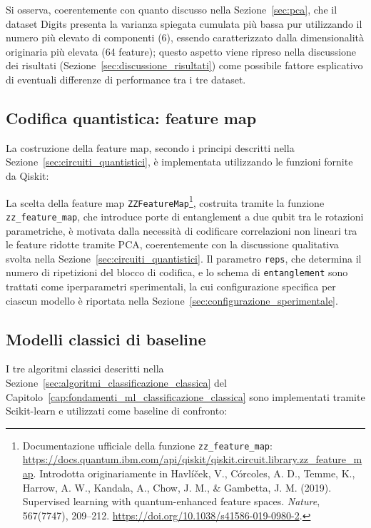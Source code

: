 Si osserva, coerentemente con quanto discusso nella Sezione~\ref{sec:pca}, che il dataset Digits presenta la varianza spiegata cumulata più bassa pur utilizzando il numero più elevato di componenti (6), essendo caratterizzato dalla dimensionalità originaria più elevata (64 feature); questo aspetto viene ripreso nella discussione dei risultati (Sezione~\ref{sec:discussione_risultati}) come possibile fattore esplicativo di eventuali differenze di performance tra i tre dataset.

\subsection{Codifica quantistica: feature map}
\label{sec:impl_feature_map}

La costruzione della feature map, secondo i principi descritti nella Sezione~\ref{sec:circuiti_quantistici}, è implementata utilizzando le funzioni fornite da Qiskit:



La scelta della feature map \texttt{ZZFeatureMap}\footnote{Documentazione ufficiale della funzione \texttt{zz\_feature\_map}: \url{https://docs.quantum.ibm.com/api/qiskit/qiskit.circuit.library.zz_feature_map}. Introdotta originariamente in Havlíček, V., Córcoles, A. D., Temme, K., Harrow, A. W., Kandala, A., Chow, J. M., \& Gambetta, J. M. (2019). Supervised learning with quantum-enhanced feature spaces. \textit{Nature}, 567(7747), 209--212. \url{https://doi.org/10.1038/s41586-019-0980-2}.}, costruita tramite la funzione \texttt{zz\_feature\_map}, che introduce porte di entanglement a due qubit tra le rotazioni parametriche, è motivata dalla necessità di codificare correlazioni non lineari tra le feature ridotte tramite PCA, coerentemente con la discussione qualitativa svolta nella Sezione~\ref{sec:circuiti_quantistici}. Il parametro \texttt{reps}, che determina il numero di ripetizioni del blocco di codifica, e lo schema di \texttt{entanglement} sono trattati come iperparametri sperimentali, la cui configurazione specifica per ciascun modello è riportata nella Sezione~\ref{sec:configurazione_sperimentale}.

\subsection{Modelli classici di baseline}
\label{sec:impl_classici}

I tre algoritmi classici descritti nella Sezione~\ref{sec:algoritmi_classificazione_classica} del Capitolo~\ref{cap:fondamenti_ml_classificazione_classica} sono implementati tramite Scikit-learn e utilizzati come baseline di confronto:

